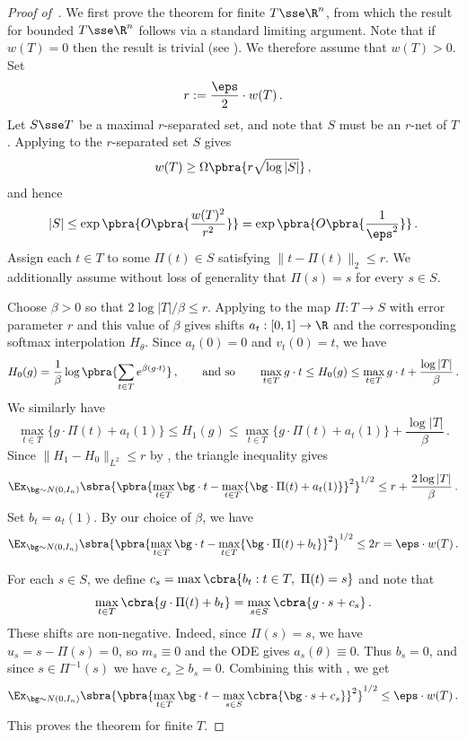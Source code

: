 \documentclass[11pt]{article}
\begin{document}
\begin{proof}[Proof of~]
	We first prove the theorem for finite $T \sse \R^n$, from which the result for bounded $T \sse \R^n$ follows via a standard limiting argument. 
	Note that if $w(T)=0$ then the result is trivial (see ). 
	We therefore assume that $w(T)>0$. 
	Set
	\[
		r
		:=
		\frac{\eps}{2}
		\cdot
		w(T)\,.
	\]
	Let $S\sse T$ be a maximal $r$-separated set, and note that $S$ must be an $r$-net of $T$. 
	Applying  to the $r$-separated set $S$ gives
	\[
		w(T)
		\geq
		\Omega\pbra{r\sqrt{\log |S|}}\,,
	\]
	and hence
	\begin{equation} \label{eq:net-size}
		|S|
		\leq
		\exp\pbra{O\pbra{
		\frac{
		w(T)^2
		}{r^2}
		}}
		=
		\exp\pbra{O\pbra{\frac{1}{\eps^2}}}\,.
	\end{equation}
	Assign each $t \in T$ to some $\Pi(t) \in S$ satisfying $\|t - \Pi(t)\|_2 \leq r$. 
	We additionally assume without loss of generality that $\Pi(s) = s$ for every $s \in S$. 
	
	Choose $\beta > 0$ so that $2\log |T|/\beta \leq r$.
	Applying  to the map $\Pi:T\to S$ with error parameter $r$ and this value of $\beta$ gives shifts $a_t:[0,1]\to\R$ and the corresponding softmax interpolation $H_\theta$.
	Since $a_t(0)=0$ and $v_t(0)=t$, we have
	\[
		H_0(g)
		=
		\frac{1}{\beta}\log\pbra{\sum_{t\in T}e^{\beta(g\cdot t)}}\,,
		\qquad\text{and so}\qquad 
		\max_{t\in T} g\cdot t
		\leq 
		H_0(g)
		\leq 
		\max_{t\in T} g\cdot t+\frac{\log |T|}{\beta}\,.
	\]
	We similarly have 
	\[
		\max_{t\in T}\{g\cdot \Pi(t)+a_t(1)\}
		\leq
		H_1(g)
		\leq
		\max_{t\in T}\{g\cdot \Pi(t)+a_t(1)\}+\frac{\log |T|}{\beta}\,.
	\]
	Since $\|H_1-H_0\|_{L^2}\leq r$ by , the triangle inequality gives
	\[
		\Ex_{\bg\sim N(0, I_n)}\sbra{\pbra{
		\max_{t\in T}\bg\cdot t
		-
		\max_{t\in T}\{\bg\cdot \Pi(t)+a_t(1)\}
		}^2}^{1/2}
		\leq 
		r+\frac{2\log |T|}{\beta}\,.
	\]
	Set $b_t=a_t(1)$.
	By our choice of $\beta$, we have
	\begin{equation} \label{eq:ahhh}
		\Ex_{\bg\sim N(0, I_n)}\sbra{\pbra{
		\max_{t\in T}\bg\cdot t
		-
		\max_{t\in T}\{\bg\cdot \Pi(t)+b_t\}
		}^2}^{1/2}
		\leq 
		2r
		=
		\eps\cdot w(T)\,. 
	\end{equation}
	
	For each $s \in S$, we define $c_s=\max\cbra{b_t:t\in T,\ \Pi(t)=s}$ and note that 
	\[
		\max_{t\in T}\cbra{g\cdot \Pi(t)+b_t}
		=
		\max_{s\in S}\cbra{g\cdot s+c_s}\,.
	\]
	These shifts are non-negative.
	Indeed, since $\Pi(s)=s$, we have $u_s=s-\Pi(s)=0$, so $m_s\equiv 0$ and the ODE gives $a_s(\theta)\equiv0$.
	Thus $b_s=0$, and since $s \in \Pi^{-1}(s)$ we have $c_s\geq b_s=0$. 
	Combining this with , we get
	\[
		\Ex_{\bg\sim N(0, I_n)}
		\sbra{
		\pbra{
		\max_{t\in T} \bg\cdot t
		-
		\max_{s\in S}\cbra{\bg\cdot s + c_s}
		}^{2}
		}^{1/2}
		\leq
		\eps\cdot w(T)\,.
	\]
	This proves the theorem for finite $T$.


\end{proof}
\end{document}
